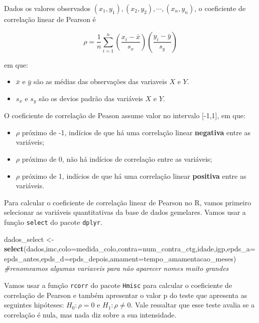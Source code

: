 \documentclass[
]{book}
\newenvironment{Shaded}{\begin{snugshade}}{\end{snugshade}}
\newcommand{\CommentTok}[1]{\textcolor[rgb]{0.56,0.35,0.01}{\textit{#1}}}
\newcommand{\DataTypeTok}[1]{\textcolor[rgb]{0.13,0.29,0.53}{#1}}
\newcommand{\KeywordTok}[1]{\textcolor[rgb]{0.13,0.29,0.53}{\textbf{#1}}}
\newcommand{\NormalTok}[1]{#1}
\newcommand{\StringTok}[1]{\textcolor[rgb]{0.31,0.60,0.02}{#1}}
\begin{document}
Dados os valores observados \((x_1,y_1), (x_2, y_2),\cdots, (x_n,y_n)\), o coeficiente de correlação linear de Pearson é

\[\rho=\frac{1}{n}\sum\limits_{i=1}^n\left(\frac{x_i-\bar{x}}{s_x}\right)\left(\frac{y_i-\bar{y}}{s_y}\right)\]

em que:

\begin{itemize}
\item
  \(\bar{x}\) e \(\bar{y}\) são as médias das observações das variaveis \(X\) e \(Y\).
\item
  \(s_{x}\) e \(s_{y}\) são os devios padrão das variáveis \(X\) e \(Y\).
\end{itemize}

O coeficiente de correlação de Peason assume valor no intervalo {[}-1,1{]}, em que:

\begin{itemize}
\item
  \(\rho\) próximo de -1, indícios de que há uma correlação linear \textbf{negativa} entre as variáveis;
\item
  \(\rho\) próximo de 0, não há indícios de correlação entre as variáveis;
\item
  \(\rho\) próximo de 1, indícios de que há uma correlação linear \textbf{positiva} entre as variáveis.
\end{itemize}

Para calcular o coeficiente de correlação linear de Pearson no R, vamos primeiro selecionar as variáveis quantitativas da base de dados gemelares. Vamos usar a função \texttt{select} do pacote \texttt{dplyr}.

\begin{Shaded}
\begin{Highlighting}[]
\NormalTok{dados_select <-}\StringTok{ }\KeywordTok{select}\NormalTok{(dados,imc,}\DataTypeTok{colo=}\NormalTok{medida_colo,}\DataTypeTok{contra=}\NormalTok{num_contra_ctg,idade,igp,}\DataTypeTok{epds_a=}\NormalTok{epds_antes,}\DataTypeTok{epds_d=}\NormalTok{epds_depois,}\DataTypeTok{amament=}\NormalTok{tempo_amamentacao_meses)}
\CommentTok{#renomeamos algumas variaveis para não aparecer nomes muito grandes}
\end{Highlighting}
\end{Shaded}

Vamos usar a função \texttt{rcorr} do pacote \texttt{Hmisc} para calcular o coeficiente de correlação de Pearson e também apresentar o valor p do teste que apresenta as seguintes hipóteses: \(H_0: \rho=0\) e \(H_1:\rho\neq 0\). Vale ressaltar que esse teste avalia se a correlação é nula, mas nada diz sobre a sua intensidade.
\end{document}
